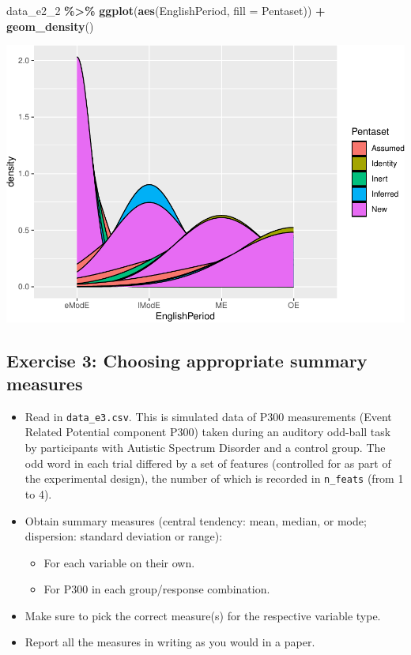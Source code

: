 \documentclass[
]{article}
\newenvironment{Shaded}{\begin{snugshade}}{\end{snugshade}}
\newcommand{\AttributeTok}[1]{\textcolor[rgb]{0.13,0.29,0.53}{#1}}
\newcommand{\FunctionTok}[1]{\textcolor[rgb]{0.13,0.29,0.53}{\textbf{#1}}}
\newcommand{\NormalTok}[1]{#1}
\newcommand{\SpecialCharTok}[1]{\textcolor[rgb]{0.81,0.36,0.00}{\textbf{#1}}}
\providecommand{\tightlist}{%
  \setlength{\itemsep}{0pt}\setlength{\parskip}{0pt}}
\begin{document}
\begin{Shaded}
\begin{Highlighting}[]
\NormalTok{data\_e2\_2 }\SpecialCharTok{\%\textgreater{}\%}
  \FunctionTok{ggplot}\NormalTok{(}\FunctionTok{aes}\NormalTok{(EnglishPeriod, }\AttributeTok{fill =}\NormalTok{ Pentaset)) }\SpecialCharTok{+}
  \FunctionTok{geom\_density}\NormalTok{()}
\end{Highlighting}
\end{Shaded}

\includegraphics{analysis_files/figure-latex/e2-2-1.pdf}

\newpage

\subsection{Exercise 3: Choosing appropriate summary
measures}\label{exercise-3-choosing-appropriate-summary-measures}

\begin{itemize}
\tightlist
\item
  Read in \texttt{data\_e3.csv}. This is simulated data of P300
  measurements (Event Related Potential component P300) taken during an
  auditory odd-ball task by participants with Autistic Spectrum Disorder
  and a control group. The odd word in each trial differed by a set of
  features (controlled for as part of the experimental design), the
  number of which is recorded in \texttt{n\_feats} (from 1 to 4).
\item
  Obtain summary measures (central tendency: mean, median, or mode;
  dispersion: standard deviation or range):

  \begin{itemize}
  \tightlist
  \item
    For each variable on their own.
  \item
    For P300 in each group/response combination.
  \end{itemize}
\item
  Make sure to pick the correct measure(s) for the respective variable
  type.
\item
  Report all the measures in writing as you would in a paper.
\end{itemize}
\end{document}
